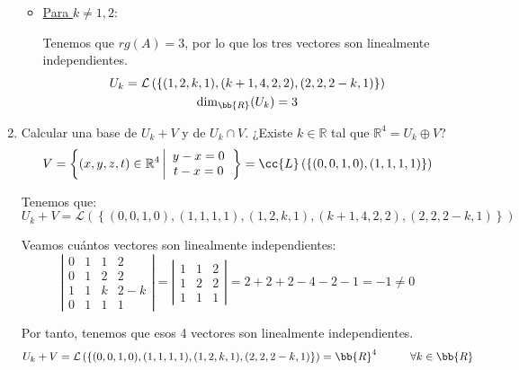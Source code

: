 \documentclass[12pt]{article}
\begin{document}
\begin{ejercicio}
\begin{enumerate}
\begin{itemize}
            \item \underline{Para $k\neq 1,2$}:

            Tenemos que $rg(A)=3$, por lo que los tres vectores son linealmente independientes.
            \begin{gather*}
                U_k = \mathcal{L}\left( \left\{ (1,2,k,1),(k+1,4,2,2),(2,2,2-k,1) \right\}\right) \\
                \dim_{\bb{R}}(U_k)=3
            \end{gather*}
        \end{itemize}

        \item Calcular una base de $U_k + V$ y de $U_k \cap V$. ¿Existe $k\in \mathbb{R}$ tal que $\mathbb{R}^4= U_k \oplus V$?
        \begin{equation*}
            V = \left\{(x,y,z,t)\in \mathbb{R}^4 \left|\begin{array}{c}
                y-x=0 \\
                t-x=0 
            \end{array}\right.\right\}
            = \cc{L}\left(\{(0,0,1,0), (1,1,1,1)\}\right)
        \end{equation*}

        Tenemos que:
        \begin{equation*}
            U_k+V = \mathcal{L}\left( \left\{ (0,0,1,0),(1,1,1,1),(1,2,k,1),(k+1,4,2,2),(2,2,2-k,1) \right\}\right)
        \end{equation*}

        Veamos cuántos vectores son linealmente independientes:
        \begin{equation*}
            \left|\begin{array}{cccc}
                0 & 1 & 1 & 2 \\
                0 & 1 & 2 & 2 \\
                1 & 1 & k & 2-k \\
                0 & 1 & 1 & 1
            \end{array}\right|
            = \left|\begin{array}{ccc}
                1 & 1 & 2 \\
                1 & 2 & 2 \\
                1 & 1 & 1
            \end{array}\right| = 2+2+2-4-2-1=-1\neq 0
        \end{equation*}

        Por tanto, tenemos que esos 4 vectores son linealmente independientes.
        \begin{equation*}
            U_k+V = \mathcal{L}\left( \left\{ (0,0,1,0),(1,1,1,1),(1,2,k,1),(2,2,2-k,1) \right\}\right) = \bb{R}^4 \qquad \quad \forall k\in \bb{R}
        \end{equation*}



\end{enumerate}
\end{ejercicio}
\end{document}
